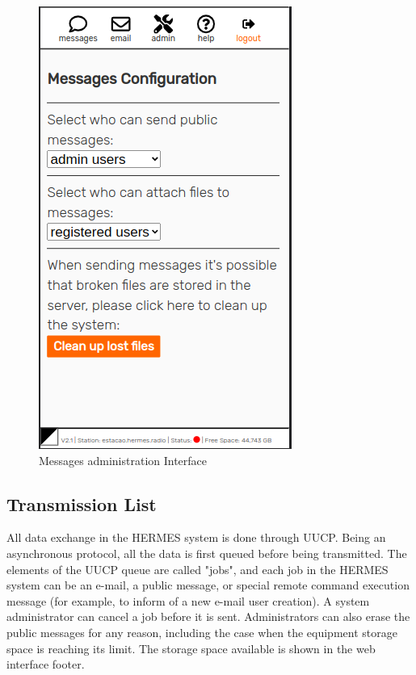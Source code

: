\documentclass[11pt,a4paper]{article}
\begin{document}
    \begin{figure}[H]
    \centering
    \includegraphics[width=0.5\columnwidth]{screenshots/frontend/en/messageadm.png}
    \caption{Messages administration Interface}
    \label{fig:messageadm}
   
    \end{figure}


\subsection{Transmission List}
\label{gui_trans_list}

All data exchange in the HERMES system is done through UUCP. Being an asynchronous protocol, all the data is first queued before being transmitted. The elements of the UUCP queue are called "jobs", and each job in the HERMES system can be an e-mail, a public message, or special remote command execution message (for example, to inform of a new e-mail user creation). A system administrator can cancel a job before it is sent. Administrators can also erase the public messages for any reason, including the case when the equipment storage space is reaching its limit. The storage space available is shown in the web interface footer.
\end{document}
